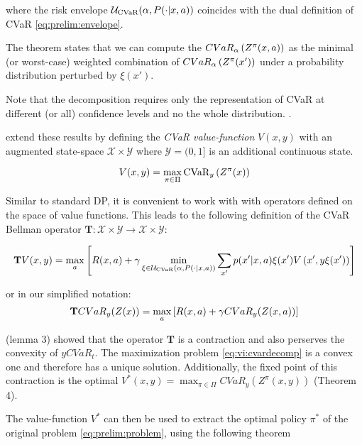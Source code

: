 where the risk envelope $\mathcal{U}_{\text{CVaR}}(\alpha, P(\cdot | x, a))$ coincides with the dual definition of CVaR \ref{eq:prelim:envelope}.

The theorem states that we can compute the $CVaR_\alpha\left( {Z^\pi(x, a)} \right)$ as the minimal (or worst-case) weighted combination of $CVaR_\alpha\left( {Z^\pi(x')} \right)$ under a probability distribution perturbed by $\xi(x')$.

Note that the decomposition requires only the representation of CVaR at different (or all) confidence levels and no the whole distribution. .

\citet{chow2015risk} extend these results by defining the \emph{CVaR value-function} $V(x, y)$ with an augmented state-space $\mathcal{X}\times\mathcal{Y}$ where $\mathcal{Y}=(0,1]$ is an additional continuous state.

\begin{equation}
V(x, y)=\max_{\pi \in \Pi} \text{CVaR}_{y}\left( {Z^\pi(x)} \right)
\end{equation}

Similar to standard DP, it is convenient to work with with operators defined on the space of value functions. This leads to the following definition of the CVaR Bellman operator $\mathbf{T}:\mathcal{X}\times\mathcal{Y}\to\mathcal{X}\times\mathcal{Y}$:

\begin{equation}
\mathbf{T}V(x, y) = \max_a \left[ { R(x, a) + \gamma \min_{\xi \in \mathcal{U}_{\text{CVaR}}(\alpha, P(\cdot | x, a))} \sum_{x'} p(x'| x, a)\xi(x') V\left( {x', y\xi(x')} \right)} \right]
\end{equation}

or in our simplified notation:
\begin{equation}
\mathbf{T} CVaR_y(Z(x))=\max_a \left[ {R(x, a) + \gamma CVaR_{y}(Z(x, a))} \right]
\end{equation}

\citep{chow2015risk}(lemma 3) showed that the operator $\mathbf{T}$ is a contraction and also perserves the convexity of $y CVaR_t$. The maximization problem \ref{eq:vi:cvardecomp} is a convex one and therefore has a unique solution. Additionally, the fixed point of this contraction is the optimal $V^*(x, y) = \max_{\pi \in \Pi} CVaR_y (Z^\pi(x, y))$ (Theorem 4).
 
The value-function $V^*$ can then be used to extract the optimal policy $\pi^*$ of the original problem \ref{eq:prelim:problem}, using the following theorem


%
%
%

